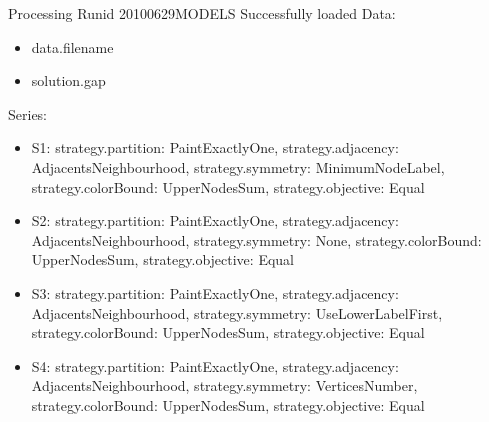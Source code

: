 \documentclass[landscape, 12pt]{report}
\begin{document}
 
 
 
 
Processing Runid 20100629MODELS
 Successfully loaded
Data:
\begin{itemize}
\item data.filename
\item solution.gap
\end{itemize}
Series:
\begin{itemize}
\item S1: strategy.partition: PaintExactlyOne, strategy.adjacency: AdjacentsNeighbourhood, strategy.symmetry: MinimumNodeLabel, strategy.colorBound: UpperNodesSum, strategy.objective: Equal
\item S2: strategy.partition: PaintExactlyOne, strategy.adjacency: AdjacentsNeighbourhood, strategy.symmetry: None, strategy.colorBound: UpperNodesSum, strategy.objective: Equal
\item S3: strategy.partition: PaintExactlyOne, strategy.adjacency: AdjacentsNeighbourhood, strategy.symmetry: UseLowerLabelFirst, strategy.colorBound: UpperNodesSum, strategy.objective: Equal
\item S4: strategy.partition: PaintExactlyOne, strategy.adjacency: AdjacentsNeighbourhood, strategy.symmetry: VerticesNumber, strategy.colorBound: UpperNodesSum, strategy.objective: Equal
\end{itemize}
\end{document}
